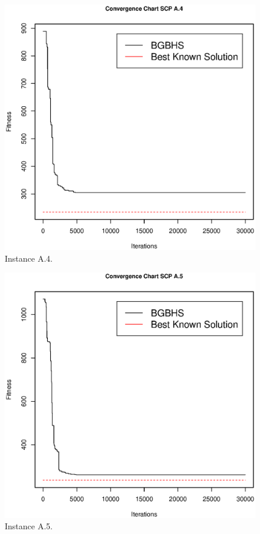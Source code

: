 \begin{figure}[]
\centering
\includegraphics[scale=.45]{Resultados/scpA4.eps}
\caption{Instance A.4.}
\label{fig:Instance.A.4}
\end{figure}

\begin{figure}[]
\centering
\includegraphics[scale=.45]{Resultados/scpA5.eps}
\caption{Instance A.5.}
\label{fig:Instance.A.5}
\end{figure}

